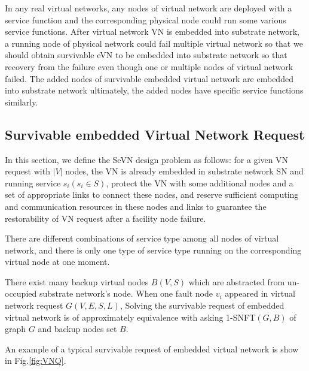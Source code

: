 In any real virtual networks, any nodes of virtual network  are deployed with a service function and the corresponding physical node could run some various service functions. After virtual network VN is embedded into substrate network, a running node of physical network could fail multiple virtual network so that we should obtain survivable eVN to be embedded into substrate network so that recovery from the failure even though one or multiple nodes of virtual network failed. The added nodes of survivable embedded virtual network are embedded into substrate network ultimately, the added nodes have specific service functions similarly.

\subsection{Survivable embedded Virtual Network Request}

In this section, we define the SeVN design problem as follows: for a given VN request with $|V|$ nodes, the VN is already embedded in substrate network SN and running service $s_i(s_i\in S)$, protect the VN with some additional nodes and a set of appropriate links to connect these nodes, and reserve sufficient computing and communication resources in these nodes and links to guarantee the restorability of VN request after a facility node failure.


There are different combinations of service type among all nodes of virtual network, and there is only one type of service type running on the corresponding virtual node at one moment.

There exist many backup virtual nodes $B(V,S)$ which are abstracted from un-occupied substrate network's node. When one fault node $v_i$ appeared in virtual network request $G(V,E,S,L)$, Solving the survivable request of embedded virtual network is of approximately equivalence with asking 1-SNFT$(G,B)$ of graph $G$ and backup nodes set $B$.

An example of a typical survivable request of embedded virtual network is show in Fig.\ref{fig:VNQ}.

